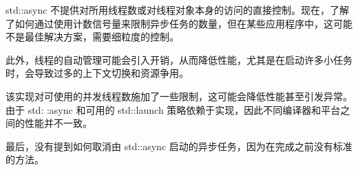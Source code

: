std::async 不提供对所用线程数或对线程对象本身的访问的直接控制。现在，了解了如何通过使用计数信号量来限制异步任务的数量，但在某些应用程序中，这可能不是最佳解决方案，需要细粒度的控制。

此外，线程的自动管理可能会引入开销，从而降低性能，尤其是在启动许多小任务时，会导致过多的上下文切换和资源争用。

该实现对可使用的并发线程数施加了一些限制，这可能会降低性能甚至引发异常。由于 std: :async 和可用的 std::launch 策略依赖于实现，因此不同编译器和平台之间的性能并不一致。

最后，没有提到如何取消由 std::async 启动的异步任务，因为在完成之前没有标准的方法。